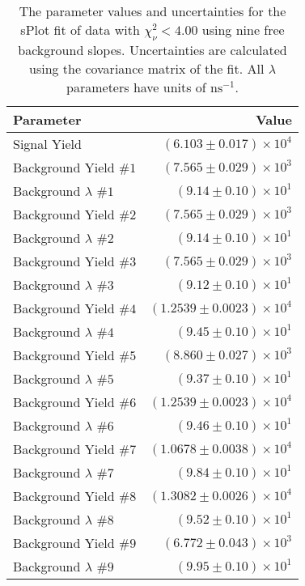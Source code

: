 
\begin{table}[ht]
    \begin{center}
        \begin{tabular}{lr}\toprule
            Parameter & Value \\\midrule
            Signal Yield & $(6.103 \pm 0.017) \times 10^{4}$ \\
            Background Yield $\#1$ & $(7.565 \pm 0.029) \times 10^{3}$ \\
            Background $\lambda$ $\#1$ & $(9.14 \pm 0.10) \times 10^{1}$ \\
            Background Yield $\#2$ & $(7.565 \pm 0.029) \times 10^{3}$ \\
            Background $\lambda$ $\#2$ & $(9.14 \pm 0.10) \times 10^{1}$ \\
            Background Yield $\#3$ & $(7.565 \pm 0.029) \times 10^{3}$ \\
            Background $\lambda$ $\#3$ & $(9.12 \pm 0.10) \times 10^{1}$ \\
            Background Yield $\#4$ & $(1.2539 \pm 0.0023) \times 10^{4}$ \\
            Background $\lambda$ $\#4$ & $(9.45 \pm 0.10) \times 10^{1}$ \\
            Background Yield $\#5$ & $(8.860 \pm 0.027) \times 10^{3}$ \\
            Background $\lambda$ $\#5$ & $(9.37 \pm 0.10) \times 10^{1}$ \\
            Background Yield $\#6$ & $(1.2539 \pm 0.0023) \times 10^{4}$ \\
            Background $\lambda$ $\#6$ & $(9.46 \pm 0.10) \times 10^{1}$ \\
            Background Yield $\#7$ & $(1.0678 \pm 0.0038) \times 10^{4}$ \\
            Background $\lambda$ $\#7$ & $(9.84 \pm 0.10) \times 10^{1}$ \\
            Background Yield $\#8$ & $(1.3082 \pm 0.0026) \times 10^{4}$ \\
            Background $\lambda$ $\#8$ & $(9.52 \pm 0.10) \times 10^{1}$ \\
            Background Yield $\#9$ & $(6.772 \pm 0.043) \times 10^{3}$ \\
            Background $\lambda$ $\#9$ & $(9.95 \pm 0.10) \times 10^{1}$ \\\bottomrule
        \end{tabular}
        \caption{The parameter values and uncertainties for the sPlot fit of data with $\chi^2_\nu < 4.00$ using nine free background slopes. Uncertainties are calculated using the covariance matrix of the fit. All $\lambda$ parameters have units of $\si{\nano\second}^{-1}$.}\label{tab:splot-fit-results-chisqdof-4.00-free-9}
    \end{center}
\end{table}
